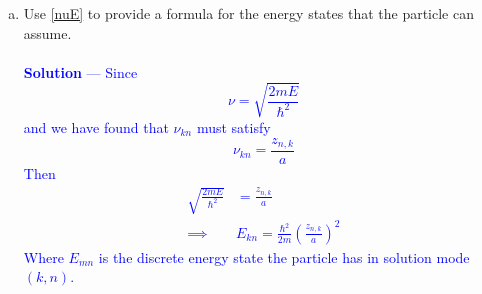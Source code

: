 \documentclass[12pt]{article}
\begin{document}
\begin{enumerate}[(a)]
\item Use \eqref{nuE} to provide a formula for the energy states that the particle can assume. \\ \\  \textcolor{blue}{\textbf{Solution} — 
Since $$\nu  = \sqrt{\frac{2mE}{\hbar^2}}$$
and we have found that $\nu_{kn}$ must satisfy 
$$\nu_{kn} = \frac{z_{n,k}}{a}$$
Then
\begin{align*}
\sqrt{\frac{2mE}{\hbar^2}} &= \frac{z_{n,k}}{a} \\
\implies& \boxed{E_{kn} = \frac{\hbar^2}{2m} \left( \frac{z_{n,k}}{a} \right)^2}
\end{align*}
Where $E_{mn}$ is the discrete energy state the particle has in solution mode $(k,n)$.
}
\end{enumerate}

\vspace{0.3in}
\end{document}
